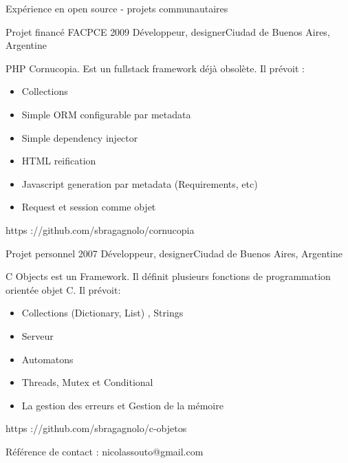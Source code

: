 \documentclass{resume} %
\begin{document}
\begin{rSection}{Exp\'{e}rience en open source - projets communautaires}
\begin{rSubsection}{Projet financ\'{e} FACPCE }{ 2009 }{D\'{e}veloppeur, designer}{Ciudad de Buenos Aires, Argentine}	
	\item PHP Cornucopia. Est un fullstack framework d\'{e}j\`{a} obsol\`{e}te. Il pr\'{e}voit :
	\begin{itemize}
		\item Collections
		\item Simple ORM configurable par metadata 
		\item Simple dependency injector
		\item HTML reification 
		\item Javascript generation par metadata (Requirements, etc)
		\item Request et session comme objet
	\end{itemize}
	\item https ://github.com/sbragagnolo/cornucopia
\end{rSubsection}
\begin{rSubsection}{Projet personnel}{ 2007 }{D\'{e}veloppeur, designer}{Ciudad de Buenos Aires, Argentine}
	\item C Objects est un Framework. Il d\'{e}finit plusieurs fonctions de programmation orient\'{e}e objet  C. Il pr\'{e}voit:
	\begin{itemize}
		\item Collections (Dictionary, List) , Strings
		\item Serveur
		\item Automatons
		\item Threads, Mutex et Conditional
		\item La gestion des erreurs et Gestion de la m\'{e}moire
	\end{itemize}
	\item https ://github.com/sbragagnolo/c-objetos
	\item R\'{e}f\'{e}rence de contact : nicolassouto@gmail.com
\end{rSubsection}
\end{rSection}

\end{document}
